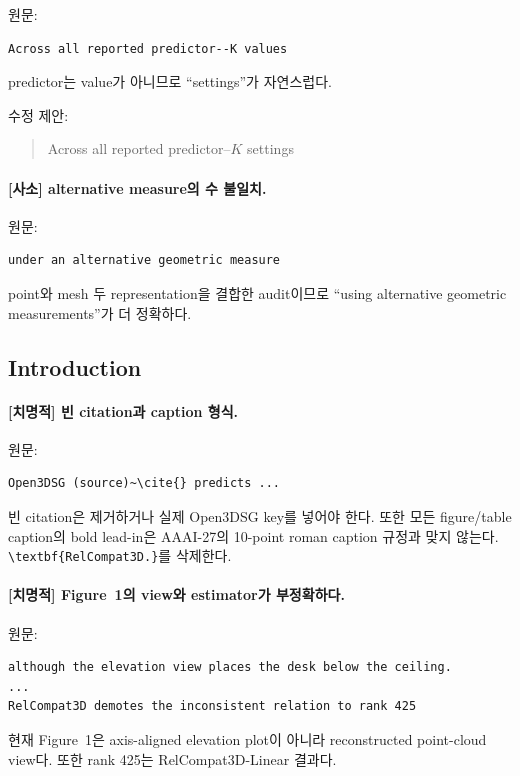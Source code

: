 \documentclass[11pt]{article}
\newcommand{\fatal}{\textbf{\textcolor{fatalred}{[치명적]}}}
\newcommand{\minor}{\textbf{\textcolor{minorblue}{[사소]}}}
\begin{document}
원문:
\begin{verbatim}
Across all reported predictor--K values
\end{verbatim}

predictor는 value가 아니므로 ``settings''가 자연스럽다.

수정 제안:
\begin{quote}
Across all reported predictor--$K$ settings
\end{quote}

\paragraph{\minor{} alternative measure의 수 불일치.}

원문:
\begin{verbatim}
under an alternative geometric measure
\end{verbatim}

point와 mesh 두 representation을 결합한 audit이므로 ``using alternative geometric
measurements''가 더 정확하다.

\subsection{Introduction}

\paragraph{\fatal{} 빈 citation과 caption 형식.}

원문:
\begin{verbatim}
Open3DSG (source)~\cite{} predicts ...
\end{verbatim}

빈 citation은 제거하거나 실제 Open3DSG key를 넣어야 한다. 또한 모든 figure/table
caption의 bold lead-in은 AAAI-27의 10-point roman caption 규정과 맞지 않는다.
\texttt{\textbackslash textbf\{RelCompat3D.\}}를 삭제한다.

\paragraph{\fatal{} Figure~1의 view와 estimator가 부정확하다.}

원문:
\begin{verbatim}
although the elevation view places the desk below the ceiling.
...
RelCompat3D demotes the inconsistent relation to rank 425
\end{verbatim}

현재 Figure~1은 axis-aligned elevation plot이 아니라 reconstructed point-cloud view다.
또한 rank 425는 RelCompat3D-Linear 결과다.
\end{document}

